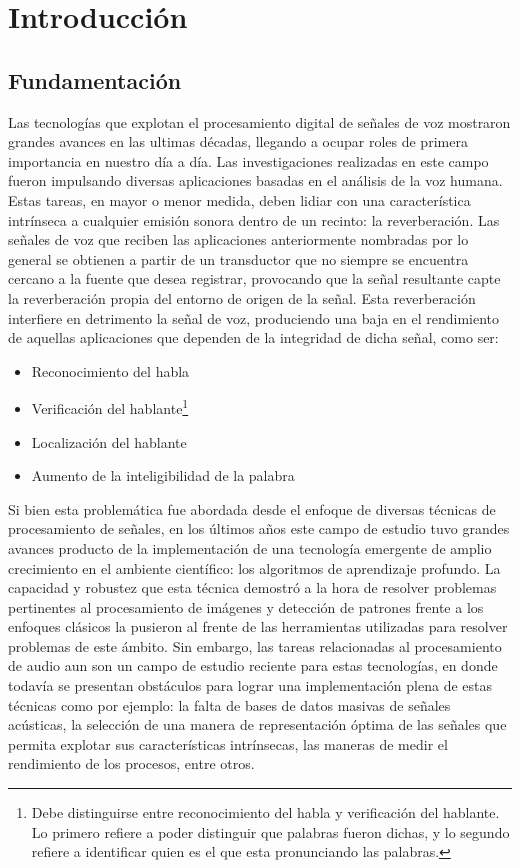 \section{Introducción} 
\subsection{Fundamentación}
Las tecnologías que explotan el procesamiento digital de señales de voz mostraron grandes avances en las ultimas décadas, llegando a ocupar roles de primera importancia en nuestro día a día. Las investigaciones realizadas en este campo fueron impulsando diversas aplicaciones basadas en el análisis de la voz humana. 
Estas tareas, en mayor o menor medida, deben lidiar con una característica intrínseca a cualquier emisión sonora dentro de un recinto: la reverberación. Las señales de voz que reciben las aplicaciones anteriormente nombradas por lo general se obtienen a partir de un transductor que no siempre se encuentra cercano a la fuente que desea registrar, provocando que la señal resultante capte la reverberación propia del entorno de origen de la señal. Esta reverberación interfiere en detrimento la señal de voz, produciendo una baja en el rendimiento de aquellas aplicaciones que dependen de la integridad de dicha señal, como ser: 

\begin{itemize}
    \item Reconocimiento del habla \cite{reconocimiento}
    \item Verificación del hablante\footnote{Debe distinguirse entre reconocimiento del habla y verificación del hablante. Lo primero refiere a poder distinguir que palabras fueron dichas, y lo segundo refiere a identificar quien es el que esta pronunciando las palabras.} \cite{verificacion}
    
    \item Localización del hablante \cite{localizacion}
    \item Aumento de la inteligibilidad de la palabra
\end{itemize}


Si bien esta problemática fue abordada desde el enfoque de diversas técnicas de procesamiento de señales, en los últimos años este campo de estudio tuvo grandes avances producto de la implementación de una tecnología emergente de amplio crecimiento en el ambiente científico: los algoritmos de aprendizaje profundo. La capacidad y robustez que esta técnica demostró a la hora de resolver problemas pertinentes al procesamiento de imágenes y detección de patrones frente a los enfoques clásicos la pusieron al frente de las herramientas utilizadas para resolver problemas de este ámbito. Sin embargo, las tareas relacionadas al procesamiento de audio aun son un campo de estudio reciente para estas tecnologías, en donde todavía se presentan obstáculos para lograr una implementación plena de estas técnicas como por ejemplo: la falta de bases de datos masivas de señales acústicas, la selección de una manera de representación óptima de las señales que permita explotar sus características intrínsecas, las maneras de medir el rendimiento de los procesos, entre otros.

